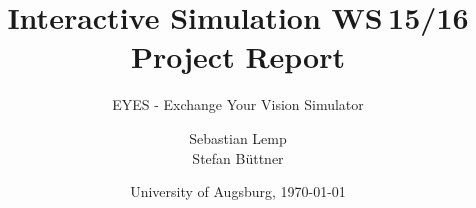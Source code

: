 \documentclass{acm_proc_article-sp}
\begin{document}
\title{
Interactive Simulation WS 15/16\\ %
Project Report
}
\subtitle{EYES - Exchange Your Vision Simulator}
\author{
\alignauthor
Sebastian Lemp\\
\alignauthor
Stefan Büttner\\
}

\date{University of Augsburg, \today}




\maketitle

\end{document}
